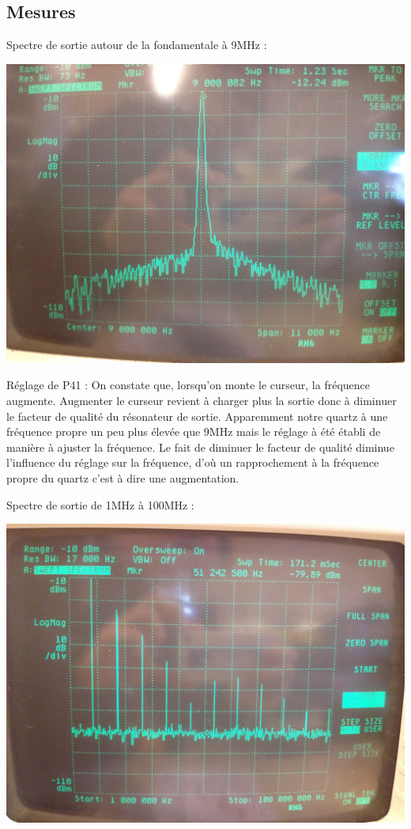 \documentclass{article}
\begin{document}
\subsection{Mesures}



Spectre de sortie autour de la fondamentale à 9MHz :\\
\begin{center}
\includegraphics[width = 0.7\linewidth]{7_3_3_spectre9MHz.jpg}
\end{center}


Réglage de P41 : On constate que, lorsqu'on monte le curseur, la fréquence augmente. Augmenter le curseur revient à charger plus la sortie donc à diminuer le facteur de qualité du résonateur de sortie. Apparemment notre quartz à une fréquence propre un peu plus élevée que 9MHz mais le réglage à été établi de manière à ajuster la fréquence. Le fait de diminuer le facteur de qualité diminue l'influence du réglage sur la fréquence, d'où un rapprochement à la fréquence propre du quartz c'est à dire une augmentation.



Spectre de sortie de 1MHz à 100MHz :\\
\begin{center}
\includegraphics[width = 0.7\linewidth]{7_3_6_1MHz_100MHz.jpg}
\end{center}
\end{document}
